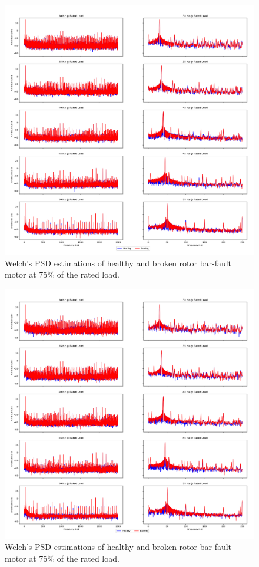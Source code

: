 \pagebreak
\begin{figure}[p]
	\centering
	\includegraphics[width=0.75\paperwidth,keepaspectratio=true]{./fig/psdrotor_100.png}
	\caption{Welch's PSD estimations of healthy and broken rotor bar-fault motor at 75$\%$ of the rated load.}	
	\label{psdrotor100}
\end{figure}
\pagebreak
\begin{figure}[p]
	\centering
	\includegraphics[width=0.75\paperwidth,keepaspectratio=true]{./fig/psdrotor_75.png}
	\caption{Welch's PSD estimations of healthy and broken rotor bar-fault motor at 75$\%$ of the rated load.}
	\label{psdrotor75}
\end{figure}

